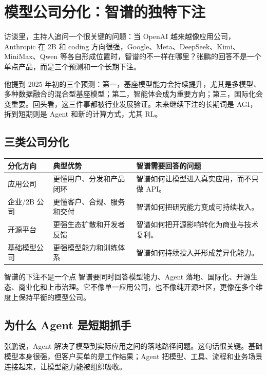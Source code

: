 \section{模型公司分化：智谱的独特下注}

访谈里，主持人追问一个很关键的问题：当 OpenAI 越来越像应用公司，Anthropic 在 2B 和 coding 方向很强，Google、Meta、DeepSeek、Kimi、MiniMax、Qwen 等各自形成位置时，智谱的不一样在哪里？张鹏的回答不是一个单点产品，而是三个预测和一个长期下注。

他提到 2025 年初的三个预测：第一，基座模型能力会持续提升，尤其是多模型、多种数据融合的混合型基座模型；第二，智能体会成为重要方向；第三，国际化会变重要。回头看，这三件事都被行业发展验证。未来继续下注的长期词是 AGI，拆到短期则是 Agent 和新的计算方式，尤其 RL。

\subsection{三类公司分化}

\begin{longtable}{p{}p{}p{}}
\toprule
分化方向 & 典型优势 & 智谱需要回答的问题 \\
\midrule
应用公司 & 更懂用户、分发和产品闭环 & 智谱如何让模型进入真实应用，而不只做 API。 \\
企业/2B 公司 & 更懂客户、合规、服务和交付 & 智谱如何把研究能力变成可持续收入。 \\
开源平台 & 更强生态扩散和开发者反馈 & 智谱如何把开源影响转化为商业与技术复利。 \\
基础模型公司 & 更强模型能力和训练体系 & 智谱如何持续投入并形成差异化能力。 \\
\bottomrule
\end{longtable}

\begin{importantbox}{智谱的下注不是一个点}
智谱要同时回答模型能力、Agent 落地、国际化、开源生态、商业化和上市治理。它不像单一应用公司，也不像纯开源社区，更像在多个维度上保持平衡的模型公司。
\end{importantbox}

\subsection{为什么 Agent 是短期抓手}

张鹏说，Agent 解决了模型到实际应用之间的落地路径问题。这句话很关键。基础模型本身很强，但客户买单的是工作结果；Agent 把模型、工具、流程和业务场景连接起来，让模型能力能被组织吸收。


